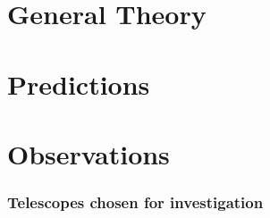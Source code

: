 \documentclass[a4paper,twoside]{article}%
\numberwithin{equation}{section}%
\renewcommand{\=}[1]{\stackrel{#1}{=}}%
\begin{document}

\newpage
\tableofcontents
{}
\listoffigures
\listoftables
\newpage

\pagestyle{headings}
    
\newpage

\part{General Theory} %
\label{prt:general_theory}
    
    

\newpage
\part{Predictions} %
\label{prt:predictions}
    
    
    
    

    
\newpage
\part{Observations} %
\label{prt:observations}
    
    

    
    
    
    

    

    \section{Telescopes chosen for investigation} %
    \label{sec:telescopes_chosen_for_investigation}
        
        
        
        

    

\newpage


\newpage
\appendix
    
    
\end{document}
